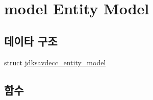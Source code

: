 \hypertarget{group__entity}{}\section{model Entity Model}
\label{group__entity}
\subsection*{데이타 구조}
\begin{DoxyCompactItemize}
\item 
struct \hyperlink{structjdksavdecc__entity__model}{jdksavdecc\+\_\+entity\+\_\+model}
\end{DoxyCompactItemize}
\subsection*{함수}
